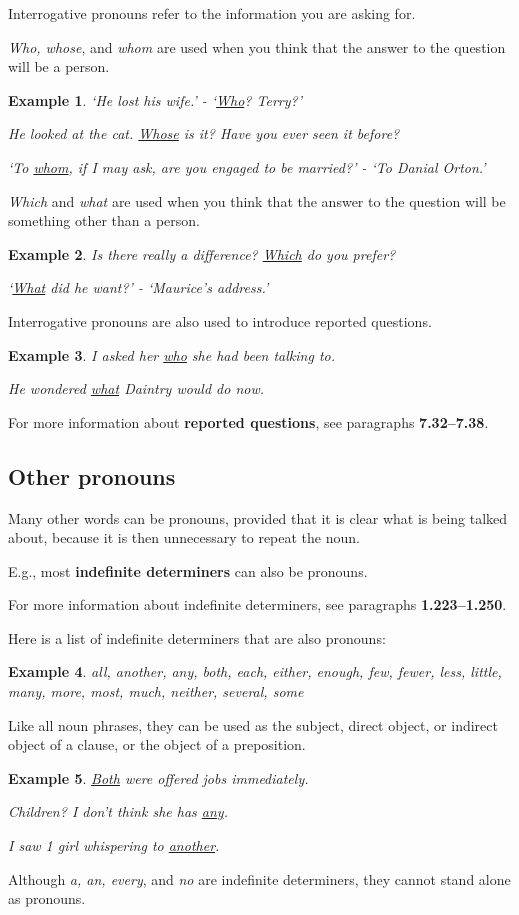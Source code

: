 \documentclass[oneside]{book}
\numberwithin{equation}{section}
\newtheorem{example}{Example}[section]
\begin{document}
%
\noindent{} Interrogative pronouns refer to the information you are asking for.

%
\textit{Who, whose}, and \textit{whom} are used when you think that the answer to the question will be a person.
\begin{example}
    `He lost his wife.' - `\underline{Who}? Terry?'
    
    He looked at the cat. \underline{Whose} is it? Have you ever seen it before?
    
    `To \underline{whom}, if I may ask, are you engaged to be married?' - `To Danial Orton.'
\end{example}
\textit{Which} and \textit{what} are used when you think that the answer to the question will be something other than a person.
\begin{example}
    Is there really a difference? \underline{Which} do you prefer?
    
    `\underline{What} did he want?' - `Maurice's address.'
\end{example}
%
\noindent{} Interrogative pronouns are also used to introduce reported questions.
\begin{example}
    I asked her \underline{who} she had been talking to.
    
    He wondered \underline{what} Daintry would do now.
\end{example}
For more information about \textbf{reported questions}, see paragraphs \textbf{7.32--7.38}.

\subsection{Other pronouns}
\noindent{} Many other words can be pronouns, provided that it is clear what is being talked about, because it is then unnecessary to repeat the noun.

%
E.g., most \textbf{indefinite determiners} can also be pronouns.

For more information about indefinite determiners, see paragraphs \textbf{1.223--1.250}.

%
Here is a list of indefinite determiners that are also pronouns:
\begin{example}
    all, another, any, both, each, either, enough, few, fewer, less, little, many, more, most, much, neither, several, some
\end{example}
Like all noun phrases, they can be used as the subject, direct object, or indirect object of a clause, or the object of a preposition.
\begin{example}
    \underline{Both} were offered jobs immediately.
    
    Children? I don't think she has \underline{any}.
    
    I saw 1 girl whispering to \underline{another}.
\end{example}
%
\noindent{} Although \textit{a, an, every}, and \textit{no} are indefinite determiners, they cannot stand alone as pronouns.
\end{document}
